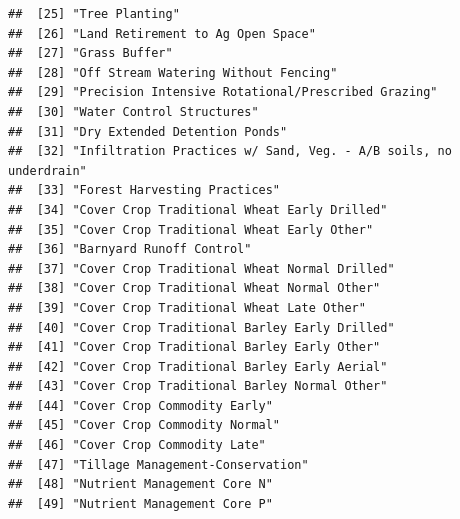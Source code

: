 \documentclass[
]{article}
\begin{document}
\begin{verbatim}
##  [25] "Tree Planting"                                                                                  
##  [26] "Land Retirement to Ag Open Space"                                                               
##  [27] "Grass Buffer"                                                                                   
##  [28] "Off Stream Watering Without Fencing"                                                            
##  [29] "Precision Intensive Rotational/Prescribed Grazing"                                              
##  [30] "Water Control Structures"                                                                       
##  [31] "Dry Extended Detention Ponds"                                                                   
##  [32] "Infiltration Practices w/ Sand, Veg. - A/B soils, no underdrain"                                
##  [33] "Forest Harvesting Practices"                                                                    
##  [34] "Cover Crop Traditional Wheat Early Drilled"                                                     
##  [35] "Cover Crop Traditional Wheat Early Other"                                                       
##  [36] "Barnyard Runoff Control"                                                                        
##  [37] "Cover Crop Traditional Wheat Normal Drilled"                                                    
##  [38] "Cover Crop Traditional Wheat Normal Other"                                                      
##  [39] "Cover Crop Traditional Wheat Late Other"                                                        
##  [40] "Cover Crop Traditional Barley Early Drilled"                                                    
##  [41] "Cover Crop Traditional Barley Early Other"                                                      
##  [42] "Cover Crop Traditional Barley Early Aerial"                                                     
##  [43] "Cover Crop Traditional Barley Normal Other"                                                     
##  [44] "Cover Crop Commodity Early"                                                                     
##  [45] "Cover Crop Commodity Normal"                                                                    
##  [46] "Cover Crop Commodity Late"                                                                      
##  [47] "Tillage Management-Conservation"                                                                
##  [48] "Nutrient Management Core N"                                                                     
##  [49] "Nutrient Management Core P"                                                                     

\end{verbatim}
\end{document}
